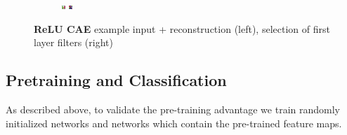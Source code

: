\documentclass{article}
\begin{document}
\begin{figure}[b]
\begin{subfigure}{0.4\linewidth}
					\includegraphics[width=0.1\linewidth]{../graphics/reconstructions/cifar/relu/relu_filter_07.png} \hspace{0.05\linewidth}
					\includegraphics[width=0.1\linewidth]{../graphics/reconstructions/cifar/relu/relu_filter_08.png} 


				\end{subfigure}

			\caption{\textbf{ReLU CAE} example input + reconstruction (left), selection of first layer filters (right) }
			\label{fig:relu_cae}

    \end{figure}

  \subsection{Pretraining and Classification}


    As described above, to validate the pre-training advantage we train randomly initialized networks and networks which contain the pre-trained feature maps.
\end{document}
